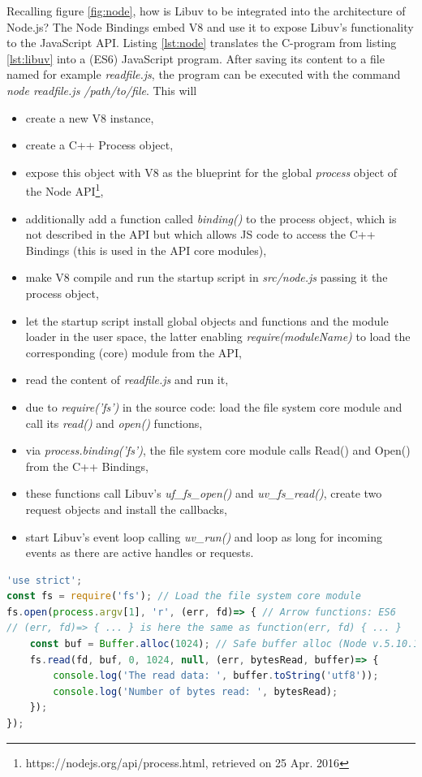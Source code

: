 Recalling figure \ref{fig:node}, how is Libuv to be integrated into the architecture of Node.js? The Node Bindings embed V8 and use it to expose Libuv's functionality to the JavaScript API. Listing \ref{lst:node} translates the C-program from listing \ref{lst:libuv} into a (ES6) JavaScript program. After saving its content to a file named for example \textit{readfile.js}, the program can be executed with the command \textit{node readfile.js /path/to/file}. This will
\begin{itemize}
    \item create a new V8 instance,
    \item create a C++ Process object,
    \item expose this object with V8 as the blueprint for the global \textit{process} object of the Node API\footnote{https://nodejs.org/api/process.html, retrieved on 25 Apr. 2016}, 
    \item additionally add a function called \textit{binding()} to the process object, which is not described in the API but which allows JS code to access the C++ Bindings (this is used in the API core modules), 
    \item make V8 compile and run the startup script in \textit{src/node.js} passing it the process object,
    \item let the startup script install global objects and functions and the module loader in the user space, the latter enabling \textit{require(moduleName)} to load the corresponding (core) module from the API,
    \item read the content of \textit{readfile.js} and run it,
    \item due to \textit{require('fs')} in the source code: load the file system core module and call its \textit{read()} and \textit{open()} functions,
    \item via \textit{process.binding('fs')}, the file system core module calls Read() and Open() from the C++ Bindings,
    \item these functions call Libuv's \textit{uf\_fs\_open()} and \textit{uv\_fs\_read()}, create two request objects and install the callbacks,
    \item start Libuv's event loop calling \textit{uv\_run()} and loop as long for incoming events as there are active handles or requests.
\end{itemize}


\begin{lstlisting}[language=Javascript, caption=Example program in JavaScript using Node.js., label=lst:node]
'use strict';
const fs = require('fs'); // Load the file system core module
fs.open(process.argv[1], 'r', (err, fd)=> { // Arrow functions: ES6
// (err, fd)=> { ... } is here the same as function(err, fd) { ... }
    const buf = Buffer.alloc(1024); // Safe buffer alloc (Node v.5.10.1+)
    fs.read(fd, buf, 0, 1024, null, (err, bytesRead, buffer)=> {
        console.log('The read data: ', buffer.toString('utf8'));
        console.log('Number of bytes read: ', bytesRead);
    });
});
\end{lstlisting}

